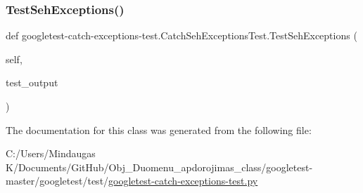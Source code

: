 \mbox{\label{classgoogletest-catch-exceptions-test_1_1_catch_seh_exceptions_test_a86d5639a464b9ee5e05816758bd1ae1f}} 
\subsubsection{\texorpdfstring{TestSehExceptions()}{TestSehExceptions()}}
{\footnotesize\ttfamily def googletest-\/catch-\/exceptions-\/test.\+Catch\+Seh\+Exceptions\+Test.\+Test\+Seh\+Exceptions (\begin{DoxyParamCaption}\item[{}]{self,  }\item[{}]{test\+\_\+output }\end{DoxyParamCaption})}



The documentation for this class was generated from the following file\+:\begin{DoxyCompactItemize}
\item 
C\+:/\+Users/\+Mindaugas K/\+Documents/\+Git\+Hub/\+Obj\+\_\+\+Duomenu\+\_\+apdorojimas\+\_\+class/googletest-\/master/googletest/test/\mbox{\hyperlink{googletest-master_2googletest_2test_2googletest-catch-exceptions-test_8py}{googletest-\/catch-\/exceptions-\/test.\+py}}\end{DoxyCompactItemize}
